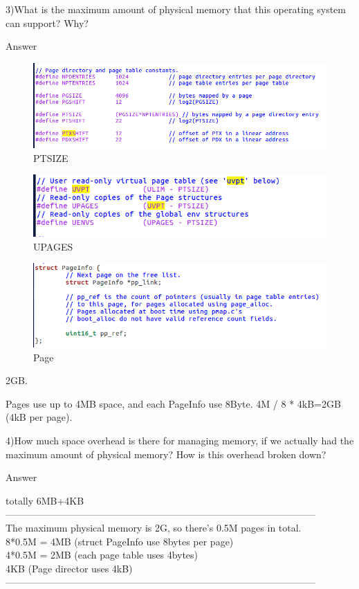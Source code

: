\begin{flushleft}
3)What is the maximum amount of physical memory that this operating system can support? Why?

{\Large Answer}
\end{flushleft}
\begin{figure}[H]
\centering
\includegraphics[width=0.8\linewidth]{figure/question4_3_1}
\caption{PTSIZE}
\end{figure}

\begin{figure}[H]
\centering
\includegraphics[width=0.8\linewidth]{figure/question4_3_2}
\caption{UPAGES}
\end{figure}

\begin{figure}[H]
\centering
\includegraphics[width=0.8\linewidth]{figure/question4_3_3}
\caption{Page}
\end{figure}

2GB.

Pages use up to 4MB space, and each PageInfo use 8Byte. 4M / 8 * 4kB=2GB (4kB per page).


\begin{flushleft}
4)How much space overhead is there for managing memory, if we actually had the maximum amount of physical memory? How is this overhead broken down?

{\Large Answer}

totally 6MB+4KB\\
————————————————————————————————\\
The maximum physical memory is 2G, so there's 0.5M pages in total.\\
8*0.5M = 4MB	(struct PageInfo use 8bytes per page)\\
4*0.5M = 2MB 	(each page table uses 4bytes)\\
4KB		(Page director uses 4kB)\\
————————————————————————————————\\
\end{flushleft}
\clearpage
